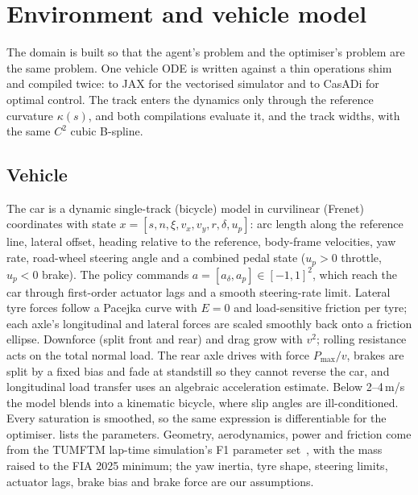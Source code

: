 \section{Environment and vehicle model}
\label{sec:env}

The domain is built so that the agent's problem and the optimiser's problem are the same
problem. One vehicle ODE is written against a thin operations shim and compiled twice:
to JAX for the vectorised simulator and to CasADi for optimal control. The track enters
the dynamics only through the reference curvature $\kappa(s)$, and both compilations
evaluate it, and the track widths, with the same $C^2$ cubic B-spline.

\subsection{Vehicle}
\label{sec:env-vehicle}

The car is a dynamic single-track (bicycle) model in curvilinear (Frenet) coordinates with
state $x = [s, n, \xi, v_x, v_y, r, \delta, u_p]$: arc length along the reference line,
lateral offset, heading relative to the reference, body-frame velocities, yaw rate,
road-wheel steering angle and a combined pedal state ($u_p > 0$ throttle, $u_p < 0$
brake). The policy commands $a = [a_\delta, a_p] \in [-1,1]^2$, which reach the car
through first-order actuator lags and a smooth steering-rate limit.
Lateral tyre forces follow a Pacejka curve with $E = 0$ and load-sensitive friction per
tyre; each axle's longitudinal and lateral forces are scaled smoothly back onto a
friction ellipse. Downforce (split front and rear) and drag grow with $v^2$; rolling
resistance acts on the total normal load. The rear axle drives with force
$P_{\max}/v$, brakes are split by a fixed bias and fade at standstill so they cannot
reverse the car, and longitudinal load transfer uses an algebraic acceleration estimate.
Below 2--4\,m/s the model blends into a kinematic bicycle, where slip angles are
ill-conditioned.
Every saturation is smoothed, so the same expression is differentiable for the
optimiser.  lists the parameters. Geometry, aerodynamics, power and
friction come from the TUMFTM lap-time simulation's F1 parameter set~\citep{tumftm_laptime},
with the mass raised to the FIA 2025 minimum; the yaw inertia, tyre shape, steering
limits, actuator lags, brake bias and brake force are our assumptions.

